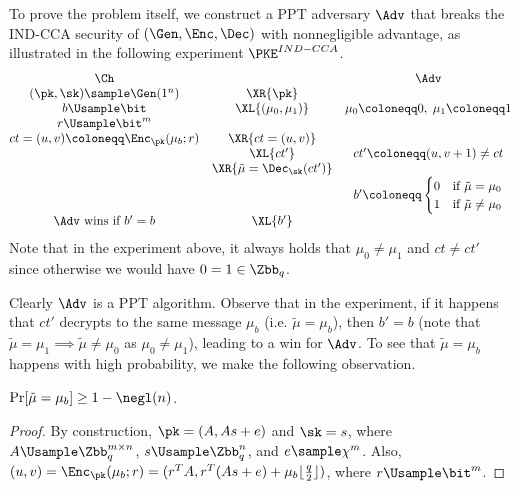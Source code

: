 \begin{answer}[ii]
    To prove the problem itself, we construct a PPT adversary $\Adv$ that breaks the IND-CCA security of  $(\Gen, \Enc, \Dec)$ with nonnegligible advantage, as illustrated in the following experiment $\PKE^{IND-CCA}$.
    {
        \[
            \begin{array}{@{} c c c @{}}
            \Ch & & \Adv \\
            (\pk, \sk)\sample \Gen(1^n) & \XR{\pk} &\\
            b\Usample\bit & \XL{(\mu_0, \mu_1)} &\mu_0\coloneqq 0,\; \mu_1\coloneqq 1 \\
            r\Usample \bit^{m} &&\\
            ct=(u,v)\coloneqq \Enc_{\pk}(\mu_b; r)  & \XR{ct=(u,v)} &\\
            & \XL{ct'} &  ct'\coloneqq (u, v+1) \neq ct\\
            & \XR{\tilde{\mu}=\Dec_\sk(ct')} & \\
            & &  b'\coloneqq  \begin{cases}
                0 &\textrm{if }  \tilde{\mu}= \mu_0\\
                1 &\textrm{if }   \tilde{\mu}\neq \mu_0\\
            \end{cases}  \\
            \textrm{$\Adv$ wins if $b' = b$} & \XL{b'} & \\
            \end{array}
        \]
        \label{fig:p5-game2}
    }
    \noindent Note that in the experiment above, it always holds that $\mu_0\neq \mu_1$ and $ct\neq ct'$ since otherwise we would have $0=1\in\Zbb_{q}$.

    Clearly $\Adv$ is a PPT algorithm. Observe that in the experiment, if it happens that  $ct'$ decrypts to the same message $\mu_b$ (i.e. $\tilde{\mu}=\mu_b$), then $b'=b$ (note that $\tilde{\mu}=\mu_1 \implies \tilde{\mu}\neq \mu_0$ as $\mu_0\neq \mu_1$), leading to a win for $\Adv$.
    To see that $\tilde{\mu}=\mu_b$ happens with high probability, we make the following observation.

    \begin{claim}\label{claim:p5-2-1}
        $\Pr[\tilde{\mu}=\mu_b]\ge 1-\negl(n)$.
    \end{claim}
    \begin{proof}
        By construction, $\pk=(A, As+e)$ and $\sk = s$, where $A\Usample\Zbb_q^{m\times n}$, $s\Usample \Zbb_q^n$, and $e\sample\chi^{m}$. Also, $(u,v)=\Enc_\pk(\mu_b; r)=(r^T A, r^T (As+e)+\mu_b\lfloor \frac{q}{2}\rfloor)$, where $r\Usample\bit^m$. 


\end{proof}
\end{answer}
